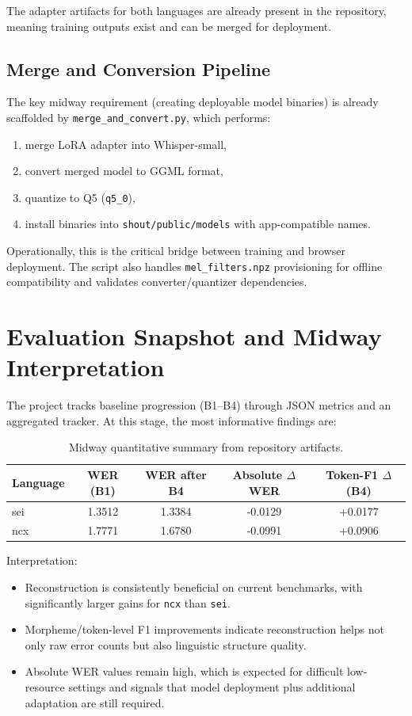 \documentclass[11pt]{article}
\begin{document}
The adapter artifacts for both languages are already present in the repository, meaning training outputs exist and can be merged for deployment.

\subsection{Merge and Conversion Pipeline}
The key midway requirement (creating deployable model binaries) is already scaffolded by \texttt{merge\_and\_convert.py}, which performs:
\begin{enumerate}[leftmargin=1.3em]
    \item merge LoRA adapter into Whisper-small,
    \item convert merged model to GGML format,
    \item quantize to Q5 (\texttt{q5\_0}),
    \item install binaries into \texttt{shout/public/models} with app-compatible names.
\end{enumerate}

Operationally, this is the critical bridge between training and browser deployment. The script also handles \texttt{mel\_filters.npz} provisioning for offline compatibility and validates converter/quantizer dependencies.

\section{Evaluation Snapshot and Midway Interpretation}
The project tracks baseline progression (B1--B4) through JSON metrics and an aggregated tracker. At this stage, the most informative findings are:

\begin{table}[H]
\centering
\caption{Midway quantitative summary from repository artifacts.}
\begin{tabular}{@{}lcccc@{}}
\toprule
\textbf{Language} & \textbf{WER (B1)} & \textbf{WER after B4} & \textbf{Absolute $\Delta$WER} & \textbf{Token-F1 $\Delta$ (B4)} \\
\midrule
sei & 1.3512 & 1.3384 & -0.0129 & +0.0177 \\
ncx & 1.7771 & 1.6780 & -0.0991 & +0.0906 \\
\bottomrule
\end{tabular}
\end{table}

\noindent Interpretation:
\begin{itemize}[leftmargin=1.3em]
    \item Reconstruction is consistently beneficial on current benchmarks, with significantly larger gains for \texttt{ncx} than \texttt{sei}.
    \item Morpheme/token-level F1 improvements indicate reconstruction helps not only raw error counts but also linguistic structure quality.
    \item Absolute WER values remain high, which is expected for difficult low-resource settings and signals that model deployment plus additional adaptation are still required.
\end{itemize}
\end{document}
